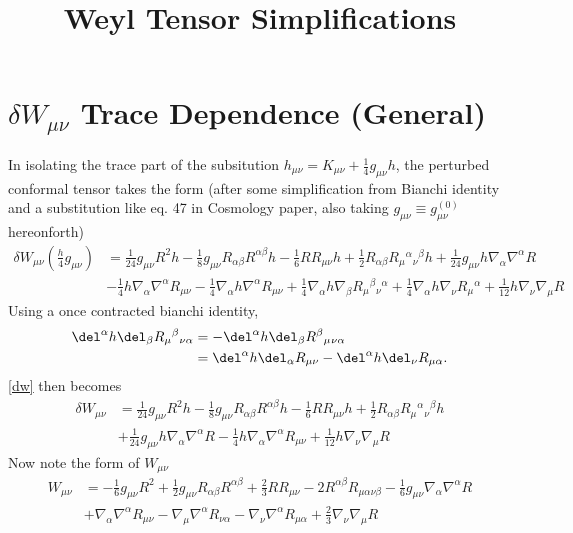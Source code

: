 \documentclass[10pt,letterpaper]{article}
\title{Weyl Tensor Simplifications}
\date{}
\begin{document}
\maketitle
\noindent
\section*{$\delta W_{\mu\nu}$ Trace Dependence (General)}
In isolating the trace part of the subsitution $h_{\mu\nu} = K_{\mu\nu}+\tfrac14 g_{\mu\nu}h$, the perturbed conformal tensor takes the form (after some simplification from Bianchi identity and a substitution like eq. 47 in Cosmology paper, also taking $g_{\mu\nu}  \equiv g_{\mu\nu}^{(0)}$ hereonforth)
\begin{align}
	\delta W_{\mu\nu}(\tfrac{h}{4}g_{\mu\nu}) &= \tfrac{1}{24} g_{\mu \nu} R^2 h -  \tfrac{1}{8} g_{\mu \nu} R_{\alpha \beta} R^{\alpha \beta} h -  \tfrac{1}{6} R R_{\mu \nu} h + \tfrac{1}{2} R_{\alpha \beta} R_{\mu}{}^{\alpha}{}_{\nu}{}^{\beta} h + \tfrac{1}{24} g_{\mu \nu} h \nabla_{\alpha}\nabla^{\alpha}R \label{dw}\\
&- \tfrac{1}{4} h \nabla_{\alpha}\nabla^{\alpha}R_{\mu \nu} -  \tfrac{1}{4} \nabla_{\alpha}h \nabla^{\alpha}R_{\mu \nu} + \tfrac{1}{4} \nabla_{\alpha}h \nabla_{\beta}R_{\mu}{}^{\beta}{}_{\nu}{}^{\alpha} + \tfrac{1}{4} \nabla_{\alpha}h \nabla_{\nu}R_{\mu}{}^{\alpha} + \tfrac{1}{12} h \nabla_{\nu}\nabla_{\mu}R\nonumber 
\end{align}
Using a once contracted bianchi identity,
\begin{align}
\del^\alpha h \del_\beta R_{\mu}{}^\beta{}_{\nu\alpha} &= -\del^\alpha h \del_\beta R^\beta{}_{\mu}{}_{\nu\alpha}\\
	& =  \del^\alpha h \del_\alpha R_{\mu\nu} -  \del^\alpha h \del_\nu R_{\mu\alpha}.\nonumber
\end{align}
\eqref{dw} then becomes 
\begin{align}
	\delta W_{\mu\nu} &= \tfrac{1}{24} g_{\mu \nu} R^2 h -  \tfrac{1}{8} g_{\mu \nu} R_{\alpha \beta} R^{\alpha \beta} h -  \tfrac{1}{6} R R_{\mu \nu} h + \tfrac{1}{2} R_{\alpha \beta} R_{\mu}{}^{\alpha}{}_{\nu}{}^{\beta} h \\
&+ \tfrac{1}{24} g_{\mu \nu} h \nabla_{\alpha}\nabla^{\alpha}R -  \tfrac{1}{4} h \nabla_{\alpha}\nabla^{\alpha}R_{\mu \nu}  + \tfrac{1}{12} h \nabla_{\nu}\nabla_{\mu}R\nonumber 
\end{align}
Now note the form of $W_{\mu\nu}$
\begin{align}
	W_{\mu\nu} &= - \tfrac{1}{6} g_{\mu \nu} R^2 + \tfrac{1}{2} g_{\mu \nu} R_{\alpha \beta} R^{\alpha \beta} + \tfrac{2}{3} R R_{\mu \nu} - 2 R^{\alpha \beta} R_{\mu \alpha \nu \beta} -  \tfrac{1}{6} g_{\mu \nu} \nabla_{\alpha}\nabla^{\alpha}R\label{weyl} \\
&+ \nabla_{\alpha}\nabla^{\alpha}R_{\mu \nu} -  \nabla_{\mu}\nabla^{\alpha}R_{\nu \alpha} -  \nabla_{\nu}\nabla^{\alpha}R_{\mu \alpha} + \tfrac{2}{3} \nabla_{\nu}\nabla_{\mu}R\nonumber
\end{align}
\end{document}
